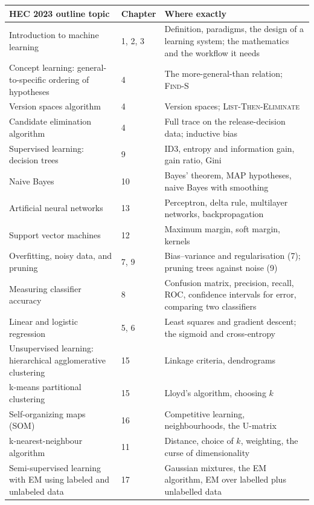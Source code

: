 \begin{longtable}{@{}L{6.4cm}L{2.0cm}L{6.6cm}@{}}
\toprule
{}
\textbf{HEC 2023 outline topic} & \textbf{Chapter} & \textbf{Where exactly} \\
\midrule
\endhead
Introduction to machine learning & 1, 2, 3 & Definition, paradigms, the design
of a learning system; the mathematics and the workflow it needs \\
Concept learning: general-to-specific ordering of hypotheses & 4 & The
more-general-than relation; \textsc{Find-S} \\
Version spaces algorithm & 4 & Version spaces; \textsc{List-Then-Eliminate} \\
Candidate elimination algorithm & 4 & Full trace on the release-decision data;
inductive bias \\
Supervised learning: decision trees & 9 & ID3, entropy and information gain,
gain ratio, Gini \\
Naive Bayes & 10 & Bayes' theorem, MAP hypotheses, naive Bayes with smoothing \\
Artificial neural networks & 13 & Perceptron, delta rule, multilayer networks,
backpropagation \\
Support vector machines & 12 & Maximum margin, soft margin, kernels \\
Overfitting, noisy data, and pruning & 7, 9 & Bias--variance and
regularisation (7); pruning trees against noise (9) \\
Measuring classifier accuracy & 8 & Confusion matrix, precision, recall, ROC,
confidence intervals for error, comparing two classifiers \\
Linear and logistic regression & 5, 6 & Least squares and gradient descent;
the sigmoid and cross-entropy \\
Unsupervised learning: hierarchical agglomerative clustering & 15 & Linkage
criteria, dendrograms \\
k-means partitional clustering & 15 & Lloyd's algorithm, choosing $k$ \\
Self-organizing maps (SOM) & 16 & Competitive learning, neighbourhoods, the
U-matrix \\
k-nearest-neighbour algorithm & 11 & Distance, choice of $k$, weighting,
the curse of dimensionality \\
Semi-supervised learning with EM using labeled and unlabeled data & 17 &
Gaussian mixtures, the EM algorithm, EM over labelled plus unlabelled data \\

\end{longtable}
